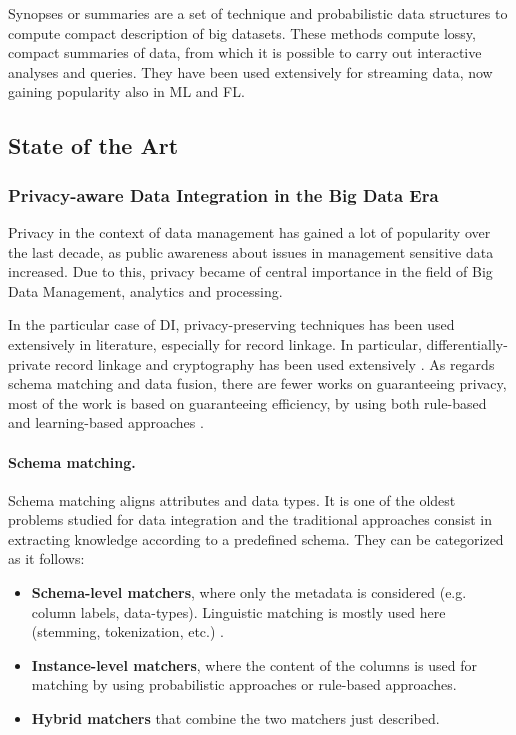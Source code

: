 \documentclass[12pt]{article}
\begin{document}
Synopses or summaries are a set of technique and probabilistic data structures to compute compact description of big datasets. 
These methods compute lossy, compact summaries of data, from which it is possible to carry out interactive analyses and queries. 
They have been used extensively for streaming data, now gaining popularity also in ML and FL.

\subsection{State of the Art}
\subsubsection{Privacy-aware Data Integration in the Big Data Era}
Privacy in the context of data management has gained a lot of popularity over the last decade, as public awareness about 
issues in management sensitive data increased. Due to this, privacy became of central importance in the field of Big Data 
Management, analytics and processing.

In the particular case of DI, privacy-preserving techniques
has been used extensively in literature, especially for record linkage. In particular, differentially-private record linkage and cryptography has
been used extensively \cite*{Khurram2020,Vatsalan2017, Clifton, Kuzu2013, Gkoulalas-Divanis2021, Nobrega2021, Bonomi2012, Kuzu2013}. 
As regards schema matching and data fusion, there are fewer works on guaranteeing privacy, most of the work is based on guaranteeing efficiency, by using 
both rule-based and learning-based approaches \cite*{Rodrigues2021,Riedel2013,Saleem2009}.


\paragraph{Schema matching.}
Schema matching aligns attributes and data types. It is one of the oldest problems studied for data integration and the 
traditional approaches consist in extracting knowledge according to a predefined schema. They can be categorized as it follows:
\begin{itemize}
   \item \textbf{Schema-level matchers}, where only the metadata is considered (e.g. column labels, data-types). Linguistic matching is mostly used here (stemming, tokenization, etc.) \cite*{Bernstein2011}.
   \item \textbf{Instance-level matchers}, where the content of the columns is used for matching by using probabilistic approaches \cite*{Szymczak2016, Dasu2002} or rule-based approaches.
   \item \textbf{Hybrid matchers} that combine the two matchers just described.
\end{itemize}
\end{document}

